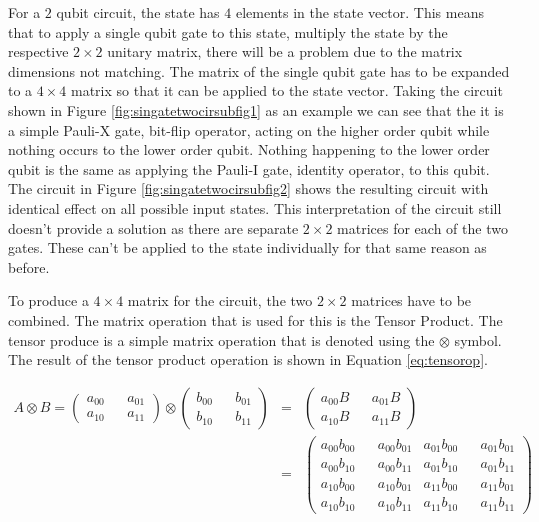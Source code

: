 For a $2$ qubit circuit, the state has $4$ elements in the state vector.
This means that to apply a single qubit gate to this state, multiply the state by the respective $2\times{2}$ unitary matrix, there will be a problem due to the matrix dimensions not matching.
The matrix of the single qubit gate has to be expanded to a $4\times{4}$ matrix so that it can be applied to the state vector.
Taking the circuit shown in Figure \ref{fig:singatetwocirsubfig1} as an example we can see that the it is a simple Pauli-X gate, bit-flip operator, acting on the higher order qubit while nothing occurs to the lower order qubit.
Nothing happening to the lower order qubit is the same as applying the Pauli-I gate, identity operator, to this qubit.
The circuit in Figure \ref{fig:singatetwocirsubfig2} shows the resulting circuit with identical effect on all possible input states.
This interpretation of the circuit still doesn't provide a solution as there are separate $2\times{2}$ matrices for each of the two gates.
These can't be applied to the state individually for that same reason as before.

To produce a $4\times{4}$ matrix for the circuit, the two $2\times{2}$ matrices have to be combined.
The matrix operation that is used for this is the Tensor Product.
The tensor produce is a simple matrix operation that is denoted using the $\otimes$ symbol.
The result of the tensor product operation is shown in Equation \ref{eq:tensorop}.

\begin{eqnarray}
A \otimes B = 
\begin{pmatrix}
a_{00} && a_{01} \\
a_{10} && a_{11}
\end{pmatrix}
\otimes
\begin{pmatrix}
b_{00} && b_{01} \\
b_{10} && b_{11}
\end{pmatrix}
&=&
\begin{pmatrix}
a_{00}B && a_{01}B \\
a_{10}B && a_{11}B
\end{pmatrix} \nonumber \\
&=&
\begin{pmatrix}
a_{00}b_{00} && a_{00}b_{01} & a_{01}b_{00} && a_{01}b_{01}\\
a_{00}b_{10} && a_{00}b_{11} & a_{01}b_{10} && a_{01}b_{11}\\
a_{10}b_{00} && a_{10}b_{01} & a_{11}b_{00} && a_{11}b_{01}\\
a_{10}b_{10} && a_{10}b_{11} & a_{11}b_{10} && a_{11}b_{11}
\end{pmatrix}
\label{eq:tensorop}
\end{eqnarray}

